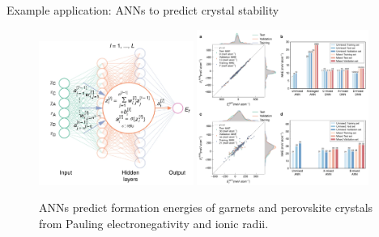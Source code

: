 \documentclass{beamer}
\begin{document}
\begin{frame}{Example application: ANNs to predict crystal stability}
\begin{figure}
    \centering
    \includegraphics[width=0.45\textwidth]{figures/dnn-crystal-stability.png}
    \includegraphics[width=0.5\textwidth]{figures/dnn-crystal-stability2.png}
    \caption{ANNs predict formation energies of garnets and perovskite crystals from Pauling electronegativity and ionic radii.\cite{yeDeepNeuralNetworks2018}}
\end{figure}
\end{frame}
\end{document}
